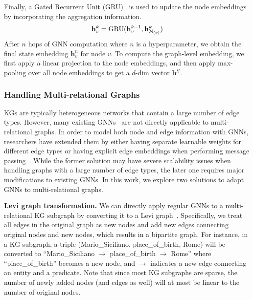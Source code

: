 \documentclass[journal]{IEEEtran}
\let\vec\mathbf
\begin{document}
Finally, a Gated Recurrent Unit (GRU)~\cite{cho2014learning} is used to update the node embeddings by incorporating the aggregation information.
\begin{equation}
\begin{aligned}
\vec{h}^{k}_v=\text{GRU}(\vec{h}^{k-1}_v, \vec{h}^k_{\EuScript{N}_{(v)}})
\end{aligned}
\end{equation}
After $n$ hops of GNN computation where $n$ is a hyperparameter,
we obtain the final state embedding $\vec{h}^{n}_v$ for node $v$.
To compute the graph-level embedding, we first apply a linear projection to the node embeddings, and then apply max-pooling over all node embeddings to get a $d$-dim vector $\vec{h}^\mathcal{G}$.




\subsubsection{Handling Multi-relational Graphs}


KGs are typically heterogeneous networks that contain a large number of edge types.
However, many existing GNNs~\cite{kipf2016semi,hamilton2017inductive,li2015gated,velivckovic2017graph} are not directly applicable to multi-relational graphs.
In order to model both node and edge information with GNNs,
researchers have extended them by either having separate learnable weights for different edge types or having explicit edge embeddings when performing message passing~\cite{gilmer2017neural,simonovsky2017dynamic}.
While the former solution may have severe scalability issues when handling graphs with a large number of edge types, 
the later one requires major modifications to existing GNNs.
In this work, we explore two solutions to adapt GNNs to multi-relational graphs.

\smallskip
\noindent\textbf{Levi graph transformation.} 
We can directly apply regular GNNs to a multi-relational KG subgraph
by converting it to a Levi graph~\cite{levi1942finite}.
Specifically, we treat all edges in the original graph as new nodes and add new edges connecting original nodes and new nodes, which results in a bipartite graph.
For instance, in a KG subgraph, a triple (Mario\_Siciliano, place\_of\_birth, Rome)
will be converted to ``Mario\_Siciliano $\rightarrow$ place\_of\_birth $\rightarrow$ Rome'' where ``place\_of\_birth'' becomes a new node, and $\rightarrow$ indicates a new edge connecting an entity and a predicate.
Note that since most KG subgraphs are sparse, the number of newly added nodes (and edges as well) will at most be linear to the number of original nodes.
\end{document}

